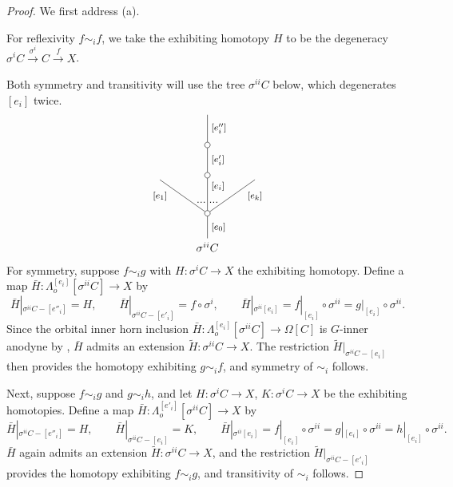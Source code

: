 \documentclass[a4paper,10pt
,draft
]{article}%
\numberwithin{equation}{section}
\numberwithin{figure}{section}
\theoremstyle{definition} %
\newcommand{\1}{\ensuremath{\mathbbm 1}}%
\begin{document}
\begin{proof}
	We first address (a). 
	
	For reflexivity $f \sim_i f$,
	we take the exhibiting homotopy 
	$H$ to be the degeneracy
	$\sigma^i C \xrightarrow{\sigma^i} C \xrightarrow{f} X$.
	
	Both symmetry and transitivity will use the 
	tree $\sigma^{ii} C$ below, which degenerates $[e_i]$ twice.
\[
\begin{tikzpicture}
[grow=up,auto,level distance=3em,
every node/.style = {font=\footnotesize},
dummy/.style={circle,draw,inner sep=0pt,minimum size=1.75mm}]
	\node at (0,0) [font=\normalsize]{$\sigma^{ii} C$}
		child{node [dummy] {}
			child{
			edge from parent node [swap,near end] {$[e_k]$} node [near start,inner sep=1pt,name=Kn] {}}
			child[level distance=3.4em]{node [dummy] {}
				child[level distance=2.7em]{node [dummy] {}
					child[level distance=2.7em]{
					edge from parent node [swap] {$[e''_i]$}
}
				edge from parent node [swap] {$[e'_i]$}
}
			edge from parent node [near end,swap] {$[e_i]$}
node [near start,inner sep=1pt,name=Kone,swap] {}
node [near start,inner sep=1pt,name=Kone1] {}}
			child{
			edge from parent node [near end] {$[e_1]$}
node [swap] {}
node [near start,inner sep=1pt,name=Kn1,swap]{}}
		edge from parent node [swap] {$[e_0]$}
		};
		\draw [dotted,thick] (Kone) -- (Kn) ;
		\draw [dotted,thick] (Kone1) -- (Kn1) ;
\end{tikzpicture}
\]
For symmetry, suppose $f \sim_i g$ with 
$H \colon \sigma^{i} C \to X$ the exhibiting homotopy.
Define a map 
$\bar{H} \colon \Lambda^{[e_i]}_o[\sigma^{ii} C] \to X$ by
\[
	\bar{H}|_{\sigma^{ii}C - [e''_i]} = H,
		\qquad
	\bar{H}|_{\sigma^{ii}C - [e'_i]} = f \circ \sigma^i,
		\qquad
	\bar{H}|_{\sigma^{ii} [e_i]} = 
	f|_{[e_i]} \circ \sigma^{ii} =
	g|_{[e_i]} \circ \sigma^{ii}.
\]
Since the orbital inner horn inclusion
$\bar{H} \colon \Lambda^{[e_i]}_o[\sigma^{ii} C] \to \Omega[C]$
is $G$-inner anodyne by \cite[Prop. 3.13]{BP_edss},
$\bar{H}$ admits an extension $\widetilde{H} \colon \sigma^{ii}C \to X$.
The restriction $\widetilde{H}|_{\sigma^{ii}C - [e_i]}$ then provides the homotopy exhibiting $g \sim_i f$, and symmetry of $\sim_i$ follows.

Next, suppose $f \sim_i g$ and $g \sim_i h$, and let 
$H \colon \sigma^{i} C \to X$,
$K \colon \sigma^{i} C \to X$ be the exhibiting homotopies.
Define a map 
$\bar{H} \colon \Lambda^{[e'_i]}_o[\sigma^{ii} C] \to X$ by
\[
	\bar{H}|_{\sigma^{ii}C - [e''_i]} = H,
		\qquad
	\bar{H}|_{\sigma^{ii}C - [e_i]} = K,
		\qquad
	\bar{H}|_{\sigma^{ii} [e_i]} = 
	f|_{[e_i]} \circ \sigma^{ii} =
	g|_{[e_i]} \circ \sigma^{ii} =
	h|_{[e_i]} \circ \sigma^{ii}.
\]
$\bar{H}$ again admits an extension $\widetilde{H} \colon \sigma^{ii}C \to X$, 
and the restriction $\widetilde{H}|_{\sigma^{ii}C - [e'_i]}$
provides the homotopy exhibiting $f \sim_i g$, and transitivity of $\sim_i$ follows.



\end{proof}
\end{document}
